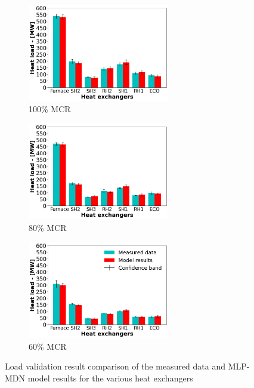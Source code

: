 \documentclass[a4paper,fleqn]{cas-dc}
\begin{document}
\begin{figure}
\centering
\begin{subfigure}{0.33\textwidth}
    \includegraphics[width=\textwidth, height = 4.25cm]{100_CASE}
    \caption{100\% MCR}
\end{subfigure}\hfill %
\begin{subfigure}{0.33\textwidth}
    \includegraphics[width=\linewidth, height = 4.25cm]{80_CASE}
    \caption{80\% MCR}
\end{subfigure}\hfill
\begin{subfigure}{0.33\textwidth}
	\includegraphics[width=\linewidth, height = 4.25cm]{60_CASE}
        \caption{60\% MCR}
\end{subfigure}
\caption{Load validation result comparison of the measured data and MLP-MDN model results for the various heat exchangers}
\label{fig_heat_load}
\end{figure}
\end{document}
